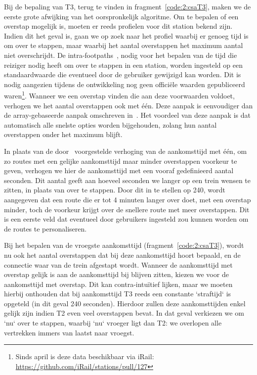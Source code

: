 Bij de bepaling van T3, terug te vinden in fragment~\ref{code:2:csaT3}, maken we de eerste grote afwijking van het oorspronkelijk algoritme. Om te bepalen of een overstap mogelijk is, moeten er reeds profielen voor dit station bekend zijn. Indien dit het geval is, gaan we op zoek naar het profiel waarbij er genoeg tijd is om over te stappen, maar waarbij het aantal overstappen het maximum aantal niet overschrijdt. 
De intra-footpaths~\citep{strasser17,hannemann08}, nodig voor het bepalen van de tijd die reiziger nodig heeft om over te stappen in een station, worden ingesteld op een standaardwaarde die eventueel door de gebruiker gewijzigd kan worden. Dit is nodig aangezien tijdens de ontwikkeling nog geen officiële waarden gepubliceerd waren\footnote{Sinds april is deze data beschikbaar via iRail: \url{https://github.com/iRail/stations/pull/127}}. 
Wanneer we een overstap vinden die aan deze voorwaarden voldoet, verhogen we het aantal overstappen ook met één. Deze aanpak is eenvoudiger dan de array-gebaseerde aanpak omschreven in~\cite{strasser17}. Het voordeel van deze aanpak is dat automatisch alle snelste opties worden bijgehouden, zolang hun aantal overstappen onder het maximum blijft. 

In plaats van de door~\cite{strasser17} voorgestelde verhoging van de aankomsttijd met één, om zo routes met een gelijke aankomsttijd maar minder overstappen voorkeur te geven, verhogen we hier de aankomsttijd met een vooraf gedefinieerd aantal seconden. Dit aantal geeft aan hoeveel seconden we langer op een trein wensen te zitten, in plaats van over te stappen. Door dit in te stellen op 240, wordt aangegeven dat een route die er tot 4 minuten langer over doet, met een overstap minder, toch de voorkeur krijgt over de snellere route met meer overstappen. Dit is een eerste veld dat eventueel door gebruikers ingesteld zou kunnen worden om de routes te personaliseren.

Bij het bepalen van de vroegste aankomsttijd (fragment~\ref{code:2:csaT3}), wordt nu ook het aantal overstappen dat bij deze aankomsttijd hoort bepaald, en de connectie waar van de trein afgestapt wordt. Wanneer de aankomsttijd met overstap gelijk is aan de aankomsttijd bij blijven zitten, kiezen we voor de aankomsttijd met overstap. Dit kan contra-intuïtief lijken, maar we moeten hierbij onthouden dat bij aankomsttijd T3 reeds een constante `straftijd` is opgeteld (in dit geval 240 seconden). Hierdoor zullen deze aankomsttijden enkel gelijk zijn indien T2 even veel overstappen bevat. In dat geval verkiezen we om `nu` over te stappen, waarbij `nu` vroeger ligt dan T2: we overlopen alle vertrekken immers van laatst naar vroegst.

